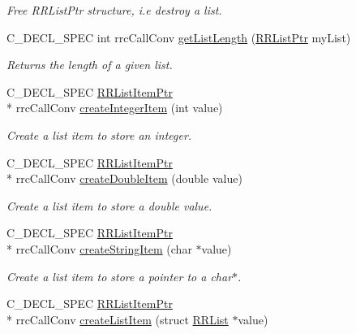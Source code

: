 \begin{DoxyCompactItemize}
\begin{DoxyCompactList}\small\item\em Free R\-R\-List\-Ptr structure, i.\-e destroy a list. \end{DoxyCompactList}\item 
C\-\_\-\-D\-E\-C\-L\-\_\-\-S\-P\-E\-C int rrc\-Call\-Conv \hyperlink{group__list_gadc06b896a3117610bbdcf25abb984f98}{get\-List\-Length} (\hyperlink{rrc__types_8h_a32a8a60ac06858ff3a791672bd2bec73}{R\-R\-List\-Ptr} my\-List)
\begin{DoxyCompactList}\small\item\em Returns the length of a given list. \end{DoxyCompactList}\item 
C\-\_\-\-D\-E\-C\-L\-\_\-\-S\-P\-E\-C \hyperlink{rrc__types_8h_a79938364b69256c42480bb3a29ebf73e}{R\-R\-List\-Item\-Ptr} \\*
rrc\-Call\-Conv \hyperlink{group__list_ga1b1b84f8ecafcb31e12e66a0f0f1b49b}{create\-Integer\-Item} (int value)
\begin{DoxyCompactList}\small\item\em Create a list item to store an integer. \end{DoxyCompactList}\item 
C\-\_\-\-D\-E\-C\-L\-\_\-\-S\-P\-E\-C \hyperlink{rrc__types_8h_a79938364b69256c42480bb3a29ebf73e}{R\-R\-List\-Item\-Ptr} \\*
rrc\-Call\-Conv \hyperlink{group__list_ga53219912496c999a31ae4f108b1a8247}{create\-Double\-Item} (double value)
\begin{DoxyCompactList}\small\item\em Create a list item to store a double value. \end{DoxyCompactList}\item 
C\-\_\-\-D\-E\-C\-L\-\_\-\-S\-P\-E\-C \hyperlink{rrc__types_8h_a79938364b69256c42480bb3a29ebf73e}{R\-R\-List\-Item\-Ptr} \\*
rrc\-Call\-Conv \hyperlink{group__list_gacc07a37b137b826130770eacd8c93d4e}{create\-String\-Item} (char $\ast$value)
\begin{DoxyCompactList}\small\item\em Create a list item to store a pointer to a char$\ast$. \end{DoxyCompactList}\item 
C\-\_\-\-D\-E\-C\-L\-\_\-\-S\-P\-E\-C \hyperlink{rrc__types_8h_a79938364b69256c42480bb3a29ebf73e}{R\-R\-List\-Item\-Ptr} \\*
rrc\-Call\-Conv \hyperlink{group__list_gab092027f0f1176d66f13cb570efa28c8}{create\-List\-Item} (struct \hyperlink{struct_r_r_list}{R\-R\-List} $\ast$value)

\end{DoxyCompactItemize}
